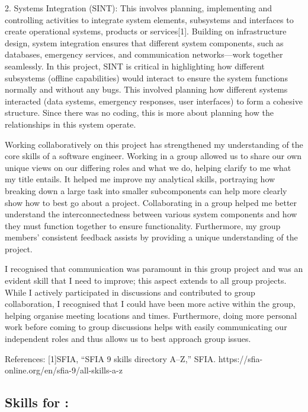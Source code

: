\documentclass[a4paper, 11pt]{report}
\begin{document}
\begin{enumerate}
2. Systems Integration (SINT): This involves planning, implementing and controlling activities to integrate system elements, subsystems and interfaces to create operational systems, products or services[1]. Building on infrastructure design, system integration ensures that different system components, such as databases, emergency services, and communication networks—work together seamlessly. In this project, SINT is critical in highlighting how different subsystems (offline capabilities) would interact to ensure the system functions normally and without any bugs. This involved planning how different systems interacted (data systems, emergency responses, user interfaces) to form a cohesive structure. Since there was no coding, this is more about planning how the relationships in this system operate.

Working collaboratively on this project has strengthened my understanding of the core skills of a software engineer. Working in a group allowed us to share our own unique views on our differing roles and what we do, helping clarify to me what my title entails. It helped me improve my analytical skills, portraying how breaking down a large task into smaller subcomponents can help more clearly show how to best go about a project. Collaborating in a group helped me better understand the interconnectedness between various system components and how they must function together to ensure functionality. Furthermore, my group members' consistent feedback assists by providing a unique understanding of the project.

I recognised that communication was paramount in this group project and was an evident skill that I need to improve; this aspect extends to all group projects. While I actively participated in discussions and contributed to group collaboration, I recognised that I could have been more active within the group, helping organise meeting locations and times. Furthermore, doing more personal work before coming to group discussions helps with easily communicating our independent roles and thus allows us to best approach group issues.



References:
[1]SFIA, “SFIA 9 skills directory A–Z,” SFIA. https://sfia-online.org/en/sfia-9/all-skills-a-z

\subsection{Skills for \majD: \studD}


\end{enumerate}
\end{document}
